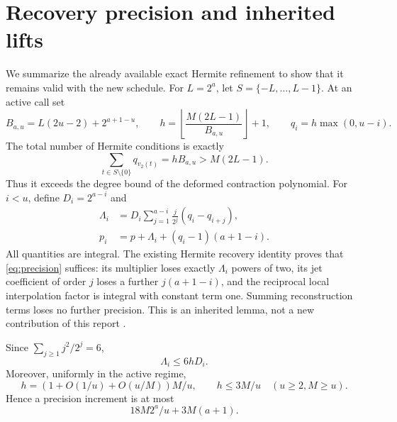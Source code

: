 \documentclass[11pt]{article}
\theoremstyle{remark}\newtheorem{remark}[theorem]{Remark}
\newcommand{\floor}[1]{\left\lfloor #1\right\rfloor}
\newcommand{\vTwo}{v_2}
\begin{document}
\section{Recovery precision and inherited lifts}
\label{sec:precision}
We summarize the already available exact Hermite refinement to show that it remains valid with the new schedule. For \(L=2^a\), let \(S=\{-L,\ldots,L-1\}\). At an active call set
\begin{equation}
 B_{a,u}=L(2u-2)+2^{a+1-u},\qquad
 h=\floor{\frac{M(2L-1)}{B_{a,u}}}+1,
 \qquad q_i=h\max(0,u-i).\label{eq:taper}
\end{equation}
The total number of Hermite conditions is exactly
\[
 \sum_{t\in S\setminus\{0\}}q_{\vTwo(t)}=hB_{a,u}>M(2L-1).
\]
Thus it exceeds the degree bound of the deformed contraction polynomial. For \(i<u\), define \(D_i=2^{a-i}\) and
\begin{align}
 \Lambda_i&=D_i\sum_{j=1}^{a-i}\frac j{2^j}(q_i-q_{i+j}),\label{eq:loss}\\
 p_i&=p+\Lambda_i+(q_i-1)(a+1-i).\label{eq:precision}
\end{align}
All quantities are integral. The existing Hermite recovery identity proves that \eqref{eq:precision} suffices: its multiplier loses exactly \(\Lambda_i\) powers of two, its jet coefficient of order \(j\) loses a further \(j(a+1-i)\), and the reciprocal local interpolation factor is integral with constant term one. Summing reconstruction terms loses no further precision. This is an inherited lemma, not a new contribution of this report \cite{packets}.

Since \(\sum_{j\ge1}j^2/2^j=6\),
\begin{equation}
 \Lambda_i\le6hD_i.\label{eq:lossupper}
\end{equation}
Moreover, uniformly in the active regime,
\begin{equation}
 h=\left(1+O(1/u)+O(u/M)\right)M/u,
 \qquad h\le3M/u\quad(u\ge2,M\ge u).
 \label{eq:hasymptotic}
\end{equation}
Hence a precision increment is at most
\[
 18M2^a/u+3M(a+1).
\]
\end{document}
